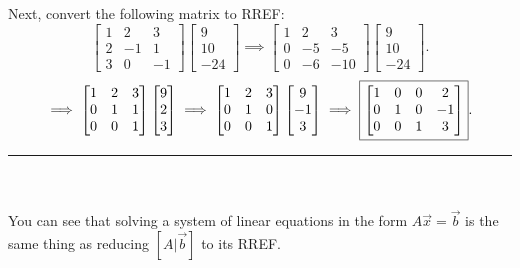 \documentclass[letterpaper]{report}
\begin{document}
Next, convert the following matrix to RREF: 
\[
\begin{bmatrix} 
    1 & 2 & 3 \\ 
    2 & -1 & 1 \\
    3 & 0 & -1
\end{bmatrix} 
\begin{bmatrix} 
9 \\ 10 \\ -24
\end{bmatrix}  \implies
\begin{bmatrix} 
    1 & 2 & 3 \\
    0 & -5 & -5 \\
    0 & -6 & -10
\end{bmatrix} 
\begin{bmatrix} 
9 \\ 10 \\ -24
\end{bmatrix} 
.\] 
\[
\implies 
\begin{bmatrix} 
    1 & 2 & 3 \\
    0 & 1 & 1 \\
    0 & 0 & 1
\end{bmatrix} 
\begin{bmatrix} 
9 \\ 2 \\ 3
\end{bmatrix} \implies
\begin{bmatrix} 
    1 & 2 & 3 \\
    0 & 1 & 0 \\
    0 & 0 & 1
\end{bmatrix} 
\begin{bmatrix} 
9 \\ -1 \\ 3
\end{bmatrix} 
\implies
\fbox{$
\begin{bmatrix} 
    1 & 0 & 0 & 2 \\
    0 & 1 & 0 & -1 \\
    0 & 0 & 1 & 3
\end{bmatrix} $}
.\] 
\rule{40}{2} \\ \\ 
You can see that solving a system of linear equations in the form $A\vec{x} = \vec{b}$ is the same thing as reducing $[A | \vec{b}]$ to its RREF. 
\end{document}
